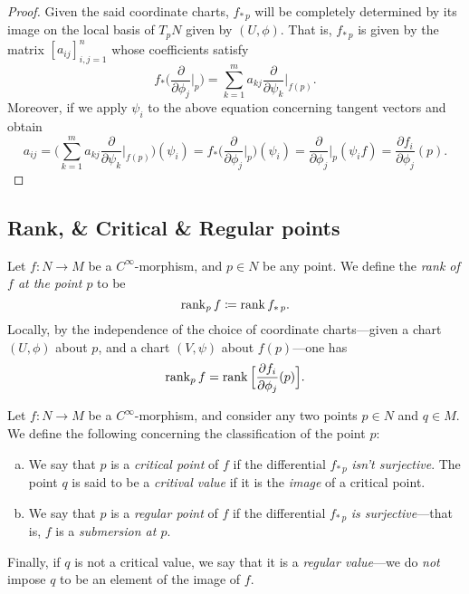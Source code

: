 \begin{proof}
    Given the said coordinate charts, \(f_{*\, p}\) will be completely determined
    by its image on the local basis of \(T_p N\) given by \((U, \phi)\). That is,
    \(f_{*\, p}\) is given by the matrix \([a_{i j}]_{i, j=1}^n\) whose coefficients
    satisfy
    \[
        f_{*} \Big( \frac{\partial}{\partial \phi_j}\Big|_p \Big)
        = \sum_{k=1}^m a_{k j} \frac{\partial}{\partial \psi_k}\Big|_{f(p)}.
    \]
    Moreover, if we apply \(\psi_i\) to the above equation concerning tangent
    vectors and obtain
    \[
        a_{ij} = \Big(
        \sum_{k=1}^m a_{k j} \frac{\partial}{\partial \psi_k}\Big|_{f(p)}
        \Big)(\psi_i)
        = f_{*}\Big( \frac{\partial}{\partial \phi_j}\Big|_p \Big)(\psi_i)
        = \frac{\partial}{\partial \phi_j}\Big|_p (\psi_i f)
        = \frac{\partial f_i}{\partial \phi_j}(p).
    \]
\end{proof}

\subsection{Rank, \& Critical \& Regular points}

\begin{definition}
    \label{def:rank-smooth-map}
    Let \(f: N \to M\) be a \(C^{\infty}\)-morphism, and \(p \in N\) be any
    point. We define the \emph{rank of \(f\) at the point \(p\)} to be
    \[
        \operatorname{rank}_p f \coloneq \operatorname{rank} f_{*\, p}.
    \]
    Locally, by the independence of the choice of coordinate charts---given a chart
    \((U, \phi)\) about \(p\), and a chart \((V, \psi)\) about \(f(p)\)---one has
    \[
        \operatorname{rank}_p f = \operatorname{rank} \Big[ \frac{\partial f_i}{\partial \phi_j}(p) \Big].
    \]
\end{definition}

\begin{definition}
    \label{def:critical-point-and-value}
    Let \(f: N \to M\) be a \(C^{\infty}\)-morphism, and consider any two points
    \(p \in N\) and \(q \in M\). We define the following concerning the
    classification of the point \(p\):
    \begin{enumerate}[(a)]\setlength\itemsep{0em}
        \item We say that \(p\) is a \emph{critical point} of \(f\) if the differential
              \(f_{*\, p}\) \emph{isn't surjective}. The point \(q\) is said to be a
              \emph{critival value} if it is the \emph{image} of a critical point.

        \item We say that \(p\) is a \emph{regular point} of \(f\) if the differential
              \(f_{*\, p}\) \emph{is surjective}---that is, \(f\) is a \emph{submersion at
                  \(p\)}.
    \end{enumerate}
    Finally, if \(q\) is not a critical value, we say that it is a \emph{regular
        value}---we do \emph{not} impose \(q\) to be an element of the image of \(f\).
\end{definition}

